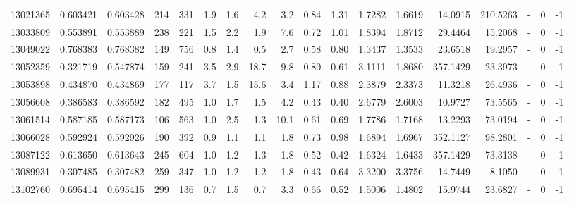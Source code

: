 \begin{tabular}{rrrrrrrrrrrrrrrlrr}
  13021365 & 0.603421 &   0.603428 &  214 &  331 &      1.9 &      1.6 &     4.2 &      3.2 &       0.84 &        1.31 &  1.7282 &  1.6619 &   14.0915 &  210.5263 &             - &        0 &         -1 \\
  13033809 & 0.553891 &   0.553889 &  238 &  221 &      1.5 &      2.2 &     1.9 &      7.6 &       0.72 &        1.01 &  1.8394 &  1.8712 &   29.4464 &   15.2068 &             - &        0 &         -1 \\
  13049022 & 0.768383 &   0.768382 &  149 &  756 &      0.8 &      1.4 &     0.5 &      2.7 &       0.58 &        0.80 &  1.3437 &  1.3533 &   23.6518 &   19.2957 &             - &        0 &         -1 \\
  13052359 & 0.321719 &   0.547874 &  159 &  241 &      3.5 &      2.9 &    18.7 &      9.8 &       0.80 &        0.61 &  3.1111 &  1.8680 &  357.1429 &   23.3973 &             - &        0 &         -1 \\
  13053898 & 0.434870 &   0.434869 &  177 &  117 &      3.7 &      1.5 &    15.6 &      3.4 &       1.17 &        0.88 &  2.3879 &  2.3373 &   11.3218 &   26.4936 &             - &        0 &         -1 \\
  13056608 & 0.386583 &   0.386592 &  182 &  495 &      1.0 &      1.7 &     1.5 &      4.2 &       0.43 &        0.40 &  2.6779 &  2.6003 &   10.9727 &   73.5565 &             - &        0 &         -1 \\
  13061514 & 0.587185 &   0.587173 &  106 &  563 &      1.0 &      2.5 &     1.3 &     10.1 &       0.61 &        0.69 &  1.7786 &  1.7168 &   13.2293 &   73.0194 &             - &        0 &         -1 \\
  13066028 & 0.592924 &   0.592926 &  190 &  392 &      0.9 &      1.1 &     1.1 &      1.8 &       0.73 &        0.98 &  1.6894 &  1.6967 &  352.1127 &   98.2801 &             - &        0 &         -1 \\
  13087122 & 0.613650 &   0.613643 &  245 &  604 &      1.0 &      1.2 &     1.3 &      1.8 &       0.52 &        0.42 &  1.6324 &  1.6433 &  357.1429 &   73.3138 &             - &        0 &         -1 \\
  13089931 & 0.307485 &   0.307482 &  259 &  347 &      1.0 &      1.2 &     1.2 &      1.8 &       0.43 &        0.64 &  3.3200 &  3.3756 &   14.7449 &    8.1050 &             - &        0 &         -1 \\
  13102760 & 0.695414 &   0.695415 &  299 &  136 &      0.7 &      1.5 &     0.7 &      3.3 &       0.66 &        0.52 &  1.5006 &  1.4802 &   15.9744 &   23.6827 &             - &        0 &         -1 \\

\end{tabular}
